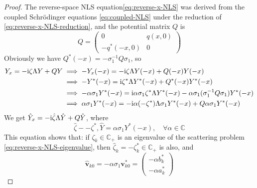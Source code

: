 \begin{proof}
    The reverse-space NLS equation\eqref{eq:reverse-x-NLS} was derived from the coupled Schrödinger equations \eqref{eq:coupled-NLS} under the reduction of \eqref{eq:reverse-x-NLS-reduction}, and the potential matrix $ Q $ is 
    \begin{equation}
        Q = \begin{pmatrix}
            0 & q(x,0) \\
            -q^{*}(-x,0) & 0
        \end{pmatrix}
    \end{equation}
    Obviously we have $ Q^{*}(-x) = - \sigma^{-1}_{1} Q \sigma_{1} $, so
    \begin{equation}
        \begin{aligned}
            Y_{x} = - \mathrm{i} \zeta \Lambda Y + QY &\implies -Y_{x}(-x) = -\mathrm{i} \zeta \Lambda Y(-x) + Q(-x)Y(-x) \\
            &\implies -Y^{*}(-x) = \mathrm{i} \zeta^{*} \Lambda Y^{*}(-x) + Q^{*}(-x)Y^{*}(-x) \\
            &\implies - \alpha \sigma_{1}Y^{*}(-x) = \mathrm{i} \alpha \sigma_{1} \zeta^{*} \Lambda Y^{*}(-x) - \alpha \sigma_{1} (\sigma_{1}^{-1}Q\sigma_{1})Y^{*}(-x) \\ 
            &\implies \alpha \sigma_{1}Y^{*}(-x) = - \mathrm{i} \alpha (-\zeta^{*}) \Lambda \sigma_{1}Y^{*}(-x) + Q \alpha \sigma_{1}Y^{*}(-x) \\
        \end{aligned}
    \end{equation}
    We get $ \hat{Y}_{x} = - \mathrm{i} \hat{\zeta}\Lambda \hat{Y} + Q \hat{Y} $, where
    \begin{equation}
        \hat{\zeta} - - \zeta^{*}, \hat{Y} = \alpha \sigma_{1}Y^{*}(-x) , \quad \forall \alpha \in \mathbb{C} 
    \end{equation}
    This equation shows that: if $ \zeta_{k} \in \mathbb{C}_{+} $ is an eigenvalue of the scattering problem \eqref{eq:reverse-x-NLS-eigenvalue}, then $ \hat{\zeta}_{k} = - \zeta_{k}^{*} \in \mathbb{C}_{+} $ is also, and 
    \begin{equation}
        \hat{\mathbf{v}}_{k0} = -\alpha \sigma_{1}\mathbf{v}_{k0}^{*} = \begin{pmatrix}
            -\alpha b_{k}^{*} \\
            -\alpha a_{k}^{*}
        \end{pmatrix} \label{eq:reverse-x-NLS-eigenvector}
    \end{equation}


\end{proof}
